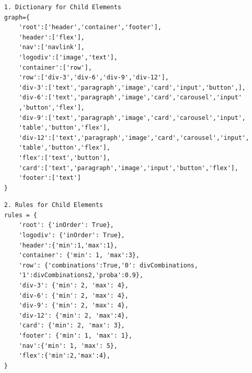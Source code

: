 \begin{verbatim}
1. Dictionary for Child Elements
graph={
    'root':['header','container','footer'],
    'header':['flex'],
    'nav':['navlink'],
    'logodiv':['image','text'],
    'container':['row'],
    'row':['div-3','div-6','div-9','div-12'],
    'div-3':['text','paragraph','image','card','input','button',],
    'div-6':['text','paragraph','image','card','carousel','input'
    ,'button','flex'],
    'div-9':['text','paragraph','image','card','carousel','input',
    'table','button','flex'],
    'div-12':['text','paragraph','image','card','carousel','input',
    'table','button','flex'],
    'flex':['text','button'],
    'card':['text','paragraph','image','input','button','flex'],
    'footer':['text']
}
\end{verbatim}
\begin{verbatim}
2. Rules for Child Elements
rules = {
    'root': {'inOrder': True},
    'logodiv': {'inOrder': True},
    'header':{'min':1,'max':1},
    'container': {'min': 1, 'max':3},
    'row': {'combinations':True,'0': divCombinations,
    '1':divCombinations2,'proba':0.9},
    'div-3': {'min': 2, 'max': 4},
    'div-6': {'min': 2, 'max': 4},
    'div-9': {'min': 2, 'max': 4},
    'div-12': {'min': 2, 'max':4},
    'card': {'min': 2, 'max': 3},
    'footer': {'min': 1, 'max': 1},
    'nav':{'min': 1, 'max': 5},
    'flex':{'min':2,'max':4},
}
\end{verbatim}
